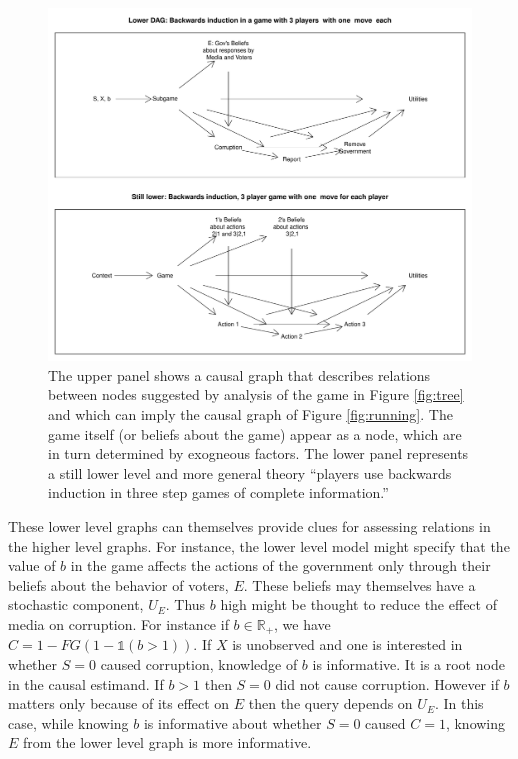 \documentclass[
  12pt,
]{book}
\begin{document}
\begin{figure}

{\centering \includegraphics[width=\textwidth]{ii_files/figure-latex/gamedag-1} 

}

\caption{\label{fig:gamedag} The upper panel shows a causal graph that describes  relations between nodes suggested by analysis of  the  game  in Figure \ref{fig:tree} and which can imply the causal graph of  Figure \ref{fig:running}. The game itself  (or beliefs about the game) appear as a node, which are in turn determined by exogneous factors.   The lower panel represents a still lower level and more general theory ``players use backwards induction in three step games of complete information.''}\label{fig:gamedag}
\end{figure}

These lower level graphs can themselves provide clues for assessing relations in the higher level graphs. For instance, the lower level model might specify that the value of \(b\) in the game affects the actions of the government only through their beliefs about the behavior of voters, \(E\). These beliefs may themselves have a stochastic component, \(U_E\). Thus \(b\) high might be thought to reduce the effect of media on corruption. For instance if \(b \in \mathbb{R}_+\), we have \(C= 1-FG(1-\mathbb{1}(b>1))\). If \(X\) is unobserved and one is interested in whether \(S=0\) caused corruption, knowledge of \(b\) is informative. It is a root node in the causal estimand. If \(b>1\) then \(S=0\) did not cause corruption. However if \(b\) matters only because of its effect on \(E\) then the query depends on \(U_E\). In this case, while knowing \(b\) is informative about whether \(S=0\) caused \(C=1\), knowing \(E\) from the lower level graph is more informative.
\end{document}
